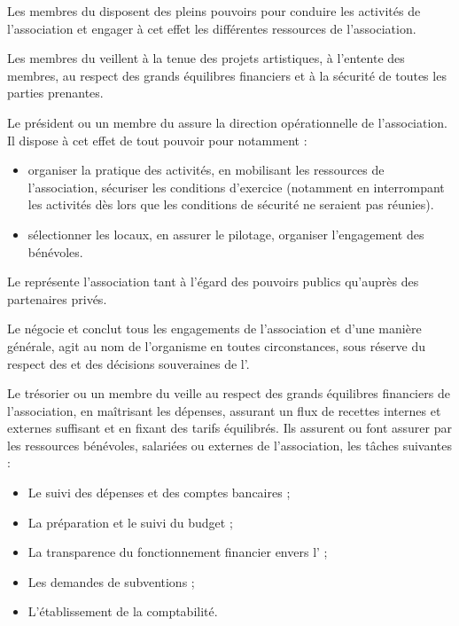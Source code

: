 \documentclass[a4paper,french,10pt]{article}
\begin{document}
Les membres du \bureau{} disposent des pleins pouvoirs pour conduire les
activités de l’association et engager à cet effet les différentes
ressources de l’association.

Les membres du \bureau{} veillent à la tenue des projets artistiques, à
l'entente des membres, au respect des grands équilibres financiers
et à la sécurité de toutes les parties prenantes.  


Le président ou un membre du \bureau{} assure la direction opérationnelle de
l’association. Il dispose à cet effet de tout pouvoir pour notamment :
\begin{itemize}
\item organiser la pratique des activités, en mobilisant les ressources de l’association, sécuriser les conditions d’exercice (notamment en interrompant les activités dès lors que les conditions de sécurité ne seraient pas réunies).
\item sélectionner les locaux, en assurer le pilotage, organiser l’engagement des bénévoles.
\end{itemize}

Le \bureau{} représente l’association tant à l’égard des pouvoirs publics qu’auprès des partenaires privés.

Le \bureau{} négocie et conclut tous les engagements de l’association et d’une manière générale, agit au nom de l’organisme en toutes circonstances, sous réserve du respect des \statuts{} et des décisions souveraines de l’\AG{}.

Le trésorier ou un membre du \bureau{} veille au respect des grands équilibres financiers de l’association, en maîtrisant les dépenses, assurant un flux de recettes internes et externes suffisant et en fixant des tarifs équilibrés. Ils assurent ou font assurer par les ressources bénévoles, salariées ou externes de l’association, les tâches suivantes :
\begin{itemize}
\item Le suivi des dépenses et des comptes bancaires ;
\item La préparation et le suivi du budget ;
\item La transparence du fonctionnement financier envers l’\AG{} ;
\item Les demandes de subventions ;
\item L’établissement de la comptabilité.
\end{itemize}
\end{document}
